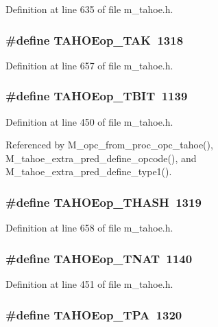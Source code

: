 Definition at line 635 of file m\_\-tahoe.h.
\subsubsection{\setlength{\rightskip}{0pt plus 5cm}\#define TAHOEop\_\-TAK~1318}\label{m__tahoe_8h_f479457017b9c305cf8ff49430e98086}




Definition at line 657 of file m\_\-tahoe.h.
\subsubsection{\setlength{\rightskip}{0pt plus 5cm}\#define TAHOEop\_\-TBIT~1139}\label{m__tahoe_8h_87d169bf0f1ec420bb28338d327b7da7}




Definition at line 450 of file m\_\-tahoe.h.

Referenced by M\_\-opc\_\-from\_\-proc\_\-opc\_\-tahoe(), M\_\-tahoe\_\-extra\_\-pred\_\-define\_\-opcode(), and M\_\-tahoe\_\-extra\_\-pred\_\-define\_\-type1().
\subsubsection{\setlength{\rightskip}{0pt plus 5cm}\#define TAHOEop\_\-THASH~1319}\label{m__tahoe_8h_56de0601a3b822b2e339bb077b1d6bc4}




Definition at line 658 of file m\_\-tahoe.h.
\subsubsection{\setlength{\rightskip}{0pt plus 5cm}\#define TAHOEop\_\-TNAT~1140}\label{m__tahoe_8h_7d3d46f3e70ae0485b1f9415313eacf8}




Definition at line 451 of file m\_\-tahoe.h.
\subsubsection{\setlength{\rightskip}{0pt plus 5cm}\#define TAHOEop\_\-TPA~1320}\label{m__tahoe_8h_ea41393f6a5b9c146a6b38d3fa3f3a12}




